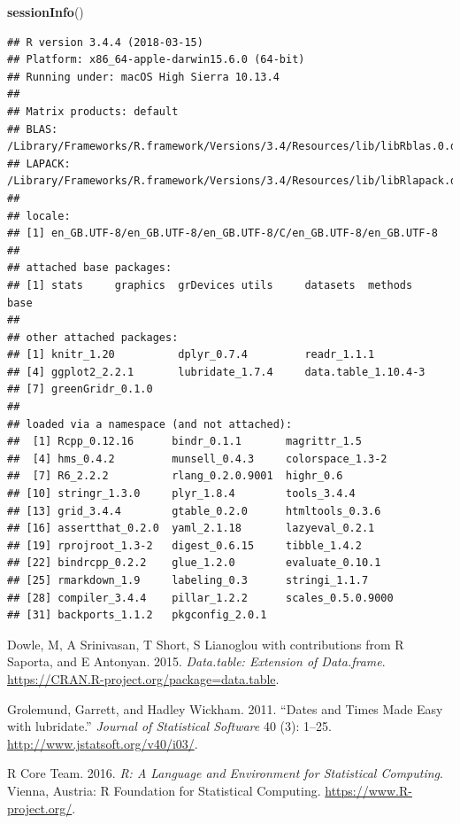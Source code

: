 \documentclass[]{article}
\newenvironment{Shaded}{\begin{snugshade}}{\end{snugshade}}
\newcommand{\KeywordTok}[1]{\textcolor[rgb]{0.13,0.29,0.53}{\textbf{#1}}}
\newcommand{\NormalTok}[1]{#1}
\begin{document}
\begin{Shaded}
\begin{Highlighting}[]
\KeywordTok{sessionInfo}\NormalTok{()}
\end{Highlighting}
\end{Shaded}

\begin{verbatim}
## R version 3.4.4 (2018-03-15)
## Platform: x86_64-apple-darwin15.6.0 (64-bit)
## Running under: macOS High Sierra 10.13.4
## 
## Matrix products: default
## BLAS: /Library/Frameworks/R.framework/Versions/3.4/Resources/lib/libRblas.0.dylib
## LAPACK: /Library/Frameworks/R.framework/Versions/3.4/Resources/lib/libRlapack.dylib
## 
## locale:
## [1] en_GB.UTF-8/en_GB.UTF-8/en_GB.UTF-8/C/en_GB.UTF-8/en_GB.UTF-8
## 
## attached base packages:
## [1] stats     graphics  grDevices utils     datasets  methods   base     
## 
## other attached packages:
## [1] knitr_1.20          dplyr_0.7.4         readr_1.1.1        
## [4] ggplot2_2.2.1       lubridate_1.7.4     data.table_1.10.4-3
## [7] greenGridr_0.1.0   
## 
## loaded via a namespace (and not attached):
##  [1] Rcpp_0.12.16      bindr_0.1.1       magrittr_1.5     
##  [4] hms_0.4.2         munsell_0.4.3     colorspace_1.3-2 
##  [7] R6_2.2.2          rlang_0.2.0.9001  highr_0.6        
## [10] stringr_1.3.0     plyr_1.8.4        tools_3.4.4      
## [13] grid_3.4.4        gtable_0.2.0      htmltools_0.3.6  
## [16] assertthat_0.2.0  yaml_2.1.18       lazyeval_0.2.1   
## [19] rprojroot_1.3-2   digest_0.6.15     tibble_1.4.2     
## [22] bindrcpp_0.2.2    glue_1.2.0        evaluate_0.10.1  
## [25] rmarkdown_1.9     labeling_0.3      stringi_1.1.7    
## [28] compiler_3.4.4    pillar_1.2.2      scales_0.5.0.9000
## [31] backports_1.1.2   pkgconfig_2.0.1
\end{verbatim}

\hypertarget{refs}{}
\hypertarget{ref-data.table}{}
Dowle, M, A Srinivasan, T Short, S Lianoglou with contributions from R
Saporta, and E Antonyan. 2015. \emph{Data.table: Extension of
Data.frame}. \url{https://CRAN.R-project.org/package=data.table}.

\hypertarget{ref-lubridate}{}
Grolemund, Garrett, and Hadley Wickham. 2011. ``Dates and Times Made
Easy with lubridate.'' \emph{Journal of Statistical Software} 40 (3):
1--25. \url{http://www.jstatsoft.org/v40/i03/}.

\hypertarget{ref-baseR}{}
R Core Team. 2016. \emph{R: A Language and Environment for Statistical
Computing}. Vienna, Austria: R Foundation for Statistical Computing.
\url{https://www.R-project.org/}.
\end{document}
